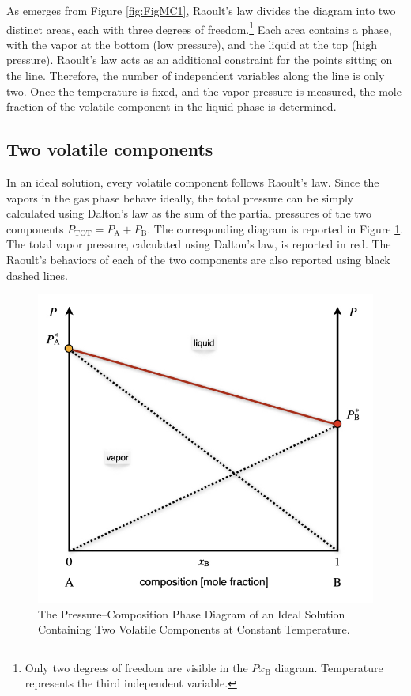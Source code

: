 \documentclass[
  9pt,
]{extbook}
\theoremstyle{definition}
\theoremstyle{definition}
\theoremstyle{definition}
\theoremstyle{remark}
\begin{document}
As emerges from Figure \ref{fig:FigMC1}, Raoult's law divides the diagram into two distinct areas, each with three degrees of freedom.\footnote{Only two degrees of freedom are visible in the \(Px_{\text{B}}\) diagram. Temperature represents the third independent variable.} Each area contains a phase, with the vapor at the bottom (low pressure), and the liquid at the top (high pressure). Raoult's law acts as an additional constraint for the points sitting on the line. Therefore, the number of independent variables along the line is only two. Once the temperature is fixed, and the vapor pressure is measured, the mole fraction of the volatile component in the liquid phase is determined.

\hypertarget{two-volatile-components}{%
\subsection{Two volatile components}\label{two-volatile-components}}

In an ideal solution, every volatile component follows Raoult's law. Since the vapors in the gas phase behave ideally, the total pressure can be simply calculated using Dalton's law as the sum of the partial pressures of the two components \(P_{\text{TOT}}=P_{\text{A}}+P_{\text{B}}\). The corresponding diagram is reported in Figure \ref{fig:FigMC2}. The total vapor pressure, calculated using Dalton's law, is reported in red. The Raoult's behaviors of each of the two components are also reported using black dashed lines.

\begin{figure}

{\centering \includegraphics[width=0.6\linewidth]{./img/OEP_Figures.020} 

}

\caption{The Pressure–Composition Phase Diagram of an Ideal Solution Containing Two Volatile Components at Constant Temperature.}\label{fig:FigMC2}
\end{figure}
\end{document}
